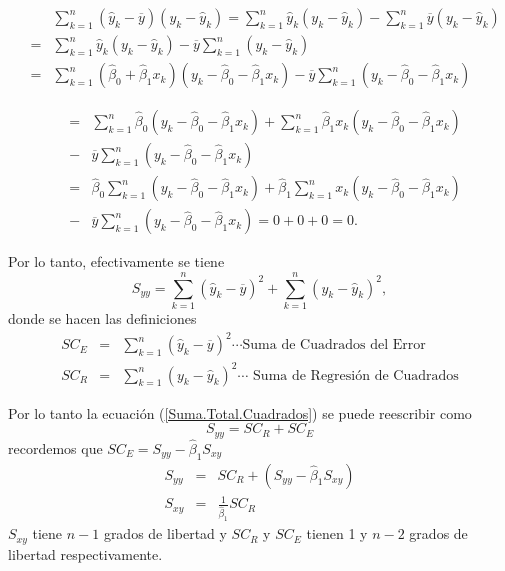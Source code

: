 \begin{eqnarray*}
&&\sum_{k=1}^{n}\left(\hat{y}_{k}-\overline{y}\right)\left(y_{k}-\hat{y}_{k}\right)=\sum_{k=1}^{n}\hat{y}_{k}\left(y_{k}-\hat{y}_{k}\right)-\sum_{k=1}^{n}\overline{y}\left(y_{k}-\hat{y}_{k}\right)\\
&=&\sum_{k=1}^{n}\hat{y}_{k}\left(y_{k}-\hat{y}_{k}\right)-\overline{y}\sum_{k=1}^{n}\left(y_{k}-\hat{y}_{k}\right)\\
&=&\sum_{k=1}^{n}\left(\hat{\beta}_{0}+\hat{\beta}_{1}x_{k}\right)\left(y_{k}-\hat{\beta}_{0}-\hat{\beta}_{1}x_{k}\right)-\overline{y}\sum_{k=1}^{n}\left(y_{k}-\hat{\beta}_{0}-\hat{\beta}_{1}x_{k}\right)
\end{eqnarray*}





\begin{eqnarray*}
&=&\sum_{k=1}^{n}\hat{\beta}_{0}\left(y_{k}-\hat{\beta}_{0}-\hat{\beta}_{1}x_{k}\right)+\sum_{k=1}^{n}\hat{\beta}_{1}x_{k}\left(y_{k}-\hat{\beta}_{0}-\hat{\beta}_{1}x_{k}\right)\\
&-&\overline{y}\sum_{k=1}^{n}\left(y_{k}-\hat{\beta}_{0}-\hat{\beta}_{1}x_{k}\right)\\
&=&\hat{\beta}_{0}\sum_{k=1}^{n}\left(y_{k}-\hat{\beta}_{0}-\hat{\beta}_{1}x_{k}\right)+\hat{\beta}_{1}\sum_{k=1}^{n}x_{k}\left(y_{k}-\hat{\beta}_{0}-\hat{\beta}_{1}x_{k}\right)\\
&-&\overline{y}\sum_{k=1}^{n}\left(y_{k}-\hat{\beta}_{0}-\hat{\beta}_{1}x_{k}\right)=0+0+0=0.
\end{eqnarray*}

Por lo tanto, efectivamente se tiene
\begin{equation}\label{Suma.Total.Cuadrados}
S_{yy}=\sum_{k=1}^{n}\left(\hat{y}_{k}-\overline{y}\right)^{2}+\sum_{k=1}^{n}\left(y_{k}-\hat{y}_{k}\right)^{2},
\end{equation}
donde se hacen las definiciones
\begin{eqnarray}
SC_{E}&=&\sum_{k=1}^{n}\left(\hat{y}_{k}-\overline{y}\right)^{2}\cdots\textrm{Suma de Cuadrados del Error}\\
SC_{R}&=&\sum_{k=1}^{n}\left(y_{k}-\hat{y}_{k}\right)^{2}\cdots\textrm{ Suma de Regresi\'on de Cuadrados}
\end{eqnarray}





Por lo tanto la ecuaci\'on (\ref{Suma.Total.Cuadrados}) se puede reescribir como 
\begin{equation}\label{Suma.Total.Cuadrados.Dos}
S_{yy}=SC_{R}+SC_{E}
\end{equation}
recordemos que $SC_{E}=S_{yy}-\hat{\beta}_{1}S_{xy}$
\begin{eqnarray*}
S_{yy}&=&SC_{R}+\left( S_{yy}-\hat{\beta}_{1}S_{xy}\right)\\
S_{xy}&=&\frac{1}{\hat{\beta}_{1}}SC_{R}
\end{eqnarray*}
$S_{xy}$ tiene $n-1$ grados de libertad y $SC_{R}$ y $SC_{E}$ tienen 1 y $n-2$ grados de libertad respectivamente.

